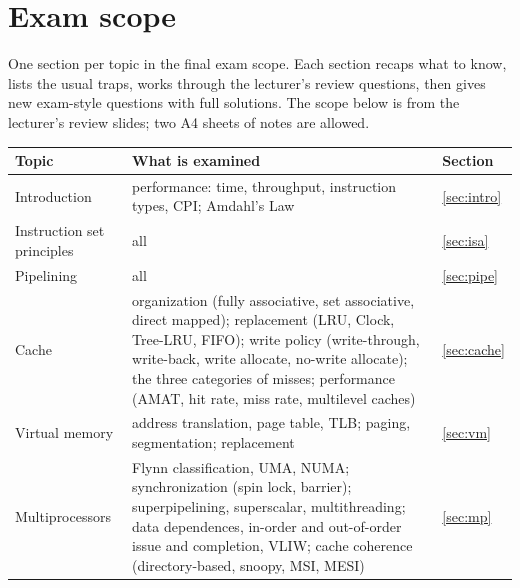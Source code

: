 \documentclass[11pt]{article}
\begin{document}
\sloppy
{}

\section*{Exam scope}
One section per topic in the final exam scope. Each section recaps what to know,
lists the usual traps, works through the lecturer's review questions, then gives
new exam-style questions with full solutions. The scope below is from the
lecturer's review slides; two A4 sheets of notes are allowed.
\begin{center}
\small
\begin{tabular}{@{}p{3.2cm}p{9.2cm}l@{}}
\toprule
Topic & What is examined & Section \\
\midrule
Introduction & performance: time, throughput, instruction types, CPI; Amdahl's Law & \ref{sec:intro} \\
Instruction set principles & all & \ref{sec:isa} \\
Pipelining & all & \ref{sec:pipe} \\
Cache & organization (fully associative, set associative, direct mapped);
replacement (LRU, Clock, Tree-LRU, FIFO); write policy (write-through, write-back,
write allocate, no-write allocate); the three categories of misses; performance
(AMAT, hit rate, miss rate, multilevel caches) & \ref{sec:cache} \\
Virtual memory & address translation, page table, TLB; paging, segmentation;
replacement & \ref{sec:vm} \\
Multiprocessors & Flynn classification, UMA, NUMA; synchronization (spin lock,
barrier); superpipelining, superscalar, multithreading; data dependences, in-order
and out-of-order issue and completion, VLIW; cache coherence (directory-based,
snoopy, MSI, MESI) & \ref{sec:mp} \\
\bottomrule
\end{tabular}
\end{center}
\clearpage







\end{document}
